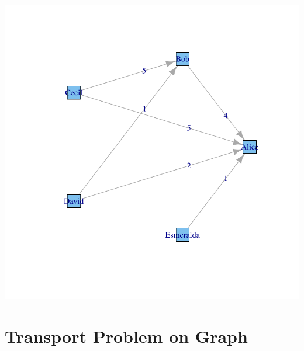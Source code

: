 \documentclass[a4paper,11pt]{scrartcl}
\begin{document}
\includegraphics{r3-045}

\section{Transport Problem on Graph}
\label{sec:Transport}
\end{document}

